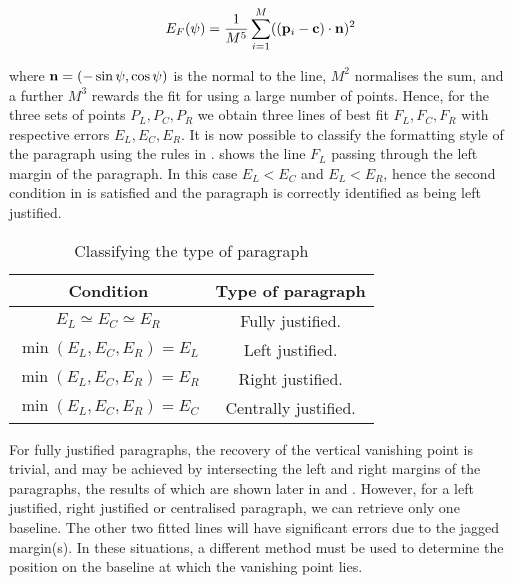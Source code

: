 \begin{equation}
E_F(\psi) = \frac{1}{M^5} \sum_{i=1}^{M} ( ({ \bf p }_i-{ \bf c }) \cdot { \bf n })^2
\label{ransacerroreqn}
\end{equation}

{\parindent 0mm
where ${ \bf n }=(-\sin \psi,\cos \psi)$ is the normal to the line, $M^{2}$
normalises the sum, and a further $M^{3}$ rewards the fit for using a large
number of points. Hence, for the three sets of points $P_L,P_C,P_R$ we obtain
three lines of best fit $F_L,F_C,F_R$ with respective errors
$E_L,E_C,E_R$.  It is now possible to classify the formatting style of the
paragraph using the rules in .  
shows the line $F_L$ passing through the left margin of the paragraph.  In this
case $E_L<E_C$ and $E_L<E_R$, hence the second condition in
 is satisfied and the paragraph is correctly identified
as being left justified.
}

\begin{table}[t]
  \begin{center}
    \begin{tabular}{|c|c|}
      \hline
      {\bf Condition} & {\bf Type of paragraph} \\
      \hline \hline
      $E_L \simeq E_C \simeq E_R$ & Fully justified. \\
      \hline
      $\min(E_L,E_C,E_R)=E_L$ & Left justified. \\
      \hline
      $\min(E_L,E_C,E_R)=E_R$ & Right justified. \\
      \hline
      $\min(E_L,E_C,E_R)=E_C$ & Centrally justified. \\
      \hline
    \end{tabular}
  \end{center}
  \caption{Classifying the type of paragraph}
  \label{typeofparatable}
\end{table}



For fully justified paragraphs, the recovery of the vertical vanishing point is
trivial, and may be achieved by intersecting the left and right margins of the
paragraphs, the results of which are shown later in  and
.  However, for a left justified, right justified or
centralised paragraph, we can retrieve only one baseline.  The other two fitted
lines will have significant errors due to the jagged margin(s).  In these
situations, a different method must be used to determine the position on the
baseline at which the vanishing point lies.






